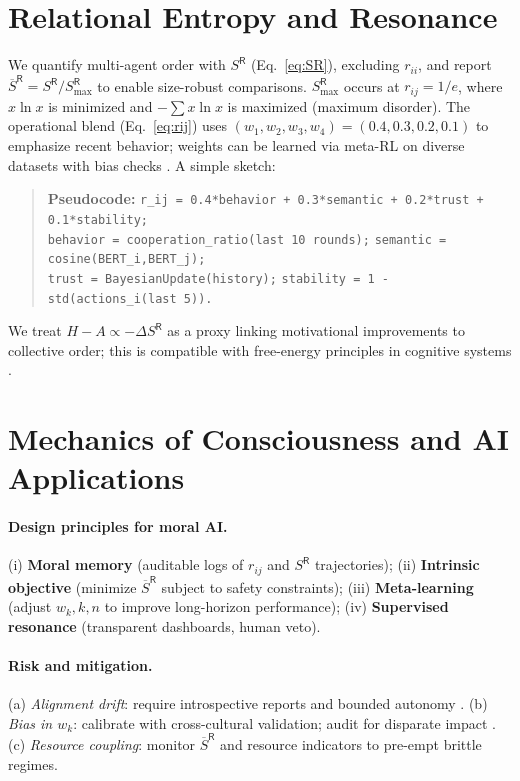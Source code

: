 \documentclass[11pt]{article}
\newcommand{\SR}{S^{\mathsf{R}}}
\newcommand{\SRbar}{\overline{S}^{\mathsf{R}}}
\begin{document}
\section{Relational Entropy and Resonance}
\label{sec:entropy}
We quantify multi-agent order with $\SR$ (Eq.~\ref{eq:SR}), excluding $r_{ii}$, and report $\SRbar=\SR/\SR_{\max}$ to enable size-robust comparisons. $\SR_{\max}$ occurs at $r_{ij}=1/e$, where $x\ln x$ is minimized and $-\sum x\ln x$ is maximized (maximum disorder). The operational blend (Eq.~\ref{eq:rij}) uses $(w_1,w_2,w_3,w_4)=(0.4,0.3,0.2,0.1)$ to emphasize recent behavior; weights can be learned via meta-RL on diverse datasets with bias checks \citep{Floridi2020,Russell2019}. A simple sketch:
\begin{quote}\small
\textbf{Pseudocode:} \texttt{r\_ij = 0.4*behavior + 0.3*semantic + 0.2*trust + 0.1*stability;}\\
\texttt{behavior = cooperation\_ratio(last 10 rounds);} \quad
\texttt{semantic = cosine(BERT\_i,BERT\_j);} \\
\texttt{trust = BayesianUpdate(history);} \quad
\texttt{stability = 1 - std(actions\_i(last 5)).}
\end{quote}
We treat $H\!-\!A \propto -\Delta\SR$ as a proxy linking motivational improvements to collective order; this is compatible with free-energy principles in cognitive systems \citep{Friston2010,HauertSzabo2005}.

\section{Mechanics of Consciousness and AI Applications}
\label{sec:ai}
\paragraph{Design principles for moral AI.} (i) \textbf{Moral memory} (auditable logs of $r_{ij}$ and $\SR$ trajectories); (ii) \textbf{Intrinsic objective} (minimize $\SRbar$ subject to safety constraints); (iii) \textbf{Meta-learning} (adjust $w_k,k,n$ to improve long-horizon performance); (iv) \textbf{Supervised resonance} (transparent dashboards, human veto).

\paragraph{Risk and mitigation.} (a) \emph{Alignment drift}: require introspective reports and bounded autonomy \citep{Amodei2016,IEEE2020}. (b) \emph{Bias in $w_k$}: calibrate with cross-cultural validation; audit for disparate impact \citep{Floridi2020,Russell2019}. (c) \emph{Resource coupling}: monitor $\SRbar$ and resource indicators to pre-empt brittle regimes.
\end{document}
